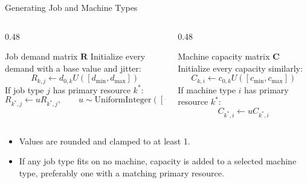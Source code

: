 \documentclass[aspectratio=169,10pt]{beamer}
\newcommand{\R}{\mathbf{R}}
\newcommand{\C}{\mathbf{C}}
\begin{document}
\begin{frame}{Generating Job and Machine Types}
  \begin{columns}[T,totalwidth=\textwidth]
    \begin{column}{0.48\textwidth}
      \begin{block}{Job demand matrix $\R$}
        Initialize every demand with a base value and jitter:
        \[
          R_{k,j}\leftarrow d_{0,k}U([d_{\min},d_{\max}])
        \]
        If job type $j$ has primary resource $k^*$:
        \[
          R_{k^*,j}\leftarrow uR_{k^*,j},
          \qquad
          u\sim\mathrm{UniformInteger}([u_{\min},u_{\max}])
        \]
      \end{block}
    \end{column}
    \begin{column}{0.48\textwidth}
      \begin{block}{Machine capacity matrix $\C$}
        Initialize every capacity similarly:
        \[
          C_{k,i}\leftarrow c_{0,k}U([c_{\min},c_{\max}])
        \]
        If machine type $i$ has primary resource $k^*$:
        \[
          C_{k^*,i}\leftarrow uC_{k^*,i}
        \]
      \end{block}
    \end{column}
  \end{columns}
  \vspace{0.15cm}
  \begin{itemize}
    \item Values are rounded and clamped to at least 1.
    \item If any job type fits on no machine, capacity is added to a selected machine type, preferably one with a matching primary resource.
  \end{itemize}
\end{frame}
\end{document}

